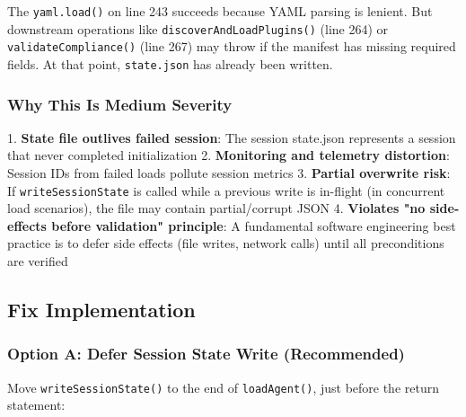 The \texttt{yaml.load()} on line 243 succeeds because YAML parsing is lenient. But downstream operations like \texttt{discoverAndLoadPlugins()} (line 264) or \texttt{validateCompliance()} (line 267) may throw if the manifest has missing required fields. At that point, \texttt{state.json} has already been written.

\subsubsection*{Why This Is Medium Severity}

1. \textbf{State file outlives failed session}: The session state.json represents a session that never completed initialization
2. \textbf{Monitoring and telemetry distortion}: Session IDs from failed loads pollute session metrics
3. \textbf{Partial overwrite risk}: If \texttt{writeSessionState} is called while a previous write is in-flight (in concurrent load scenarios), the file may contain partial/corrupt JSON
4. \textbf{Violates "no side-effects before validation" principle}: A fundamental software engineering best practice is to defer side effects (file writes, network calls) until all preconditions are verified


\subsection*{Fix Implementation}
\subsubsection*{Option A: Defer Session State Write (Recommended)}

Move \texttt{writeSessionState()} to the end of \texttt{loadAgent()}, just before the return statement:



